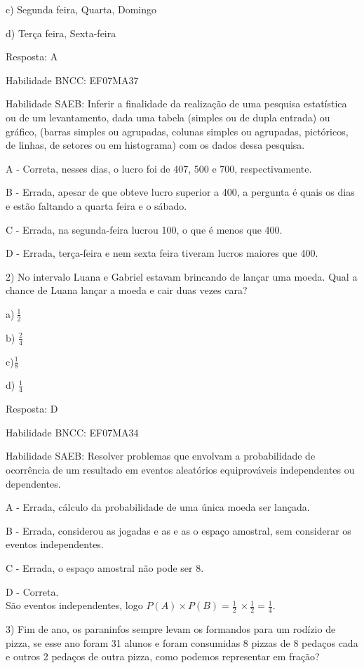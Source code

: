 c) Segunda feira, Quarta, Domingo

d) Terça feira, Sexta-feira

Resposta: A

Habilidade BNCC: EF07MA37

Habilidade SAEB: Inferir a finalidade da realização de uma pesquisa
estatística ou de um levantamento, dada uma tabela (simples ou de dupla
entrada) ou gráfico, (barras simples ou agrupadas, colunas simples ou
agrupadas, pictóricos, de linhas, de setores ou em histograma) com os
dados dessa pesquisa.~

A - Correta, nesses dias, o lucro foi de 407, 500 e 700,
respectivamente.

B - Errada, apesar de que obteve lucro superior a 400, a pergunta é
quais os dias e estão faltando a quarta feira e o sábado.

C - Errada, na segunda-feira lucrou 100, o que é menos que 400.

D - Errada, terça-feira e nem sexta feira tiveram lucros maiores que
400.

2) No intervalo Luana e Gabriel estavam brincando de lançar uma moeda.
Qual a chance de Luana lançar a moeda e cair duas vezes cara?

a)\(\ \frac{1}{2}\)

b) \(\frac{2}{4}\)

c)\(\frac{1}{8}\)

d) \(\frac{1}{4}\)

Resposta: D

Habilidade BNCC: EF07MA34

Habilidade SAEB: Resolver problemas que envolvam a probabilidade de
ocorrência de um resultado em eventos aleatórios equiprováveis
independentes ou dependentes.

A - Errada, cálculo da probabilidade de uma única moeda ser lançada.

B - Errada, considerou as jogadas e as e as o espaço amostral, sem
considerar os eventos independentes.

C - Errada, o espaço amostral não pode ser 8.

D - Correta.\\
São eventos independentes, logo
\(P\left( A \right) \times P\left( B \right) = \frac{1}{2}\  \times \frac{1}{2} = \frac{1}{4}\).

3) Fim de ano, os paraninfos sempre levam os formandos para um rodízio
de pizza, se esse ano foram 31 alunos e foram consumidas 8 pizzas de 8
pedaços cada e outros 2 pedaços de outra pizza, como podemos representar
em fração?

